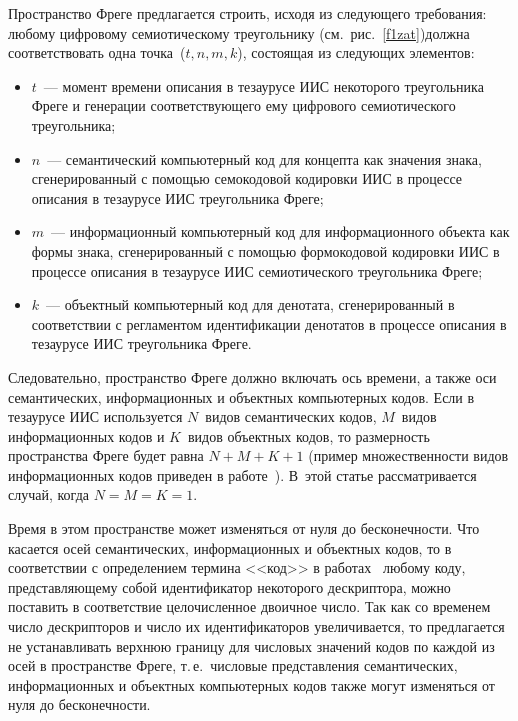 \begin{multicols}{2}
   Пространство Фреге предлагается строить, исходя из следующего требования: любому 
циф\-ровому семиотическому треугольнику (см.\ рис.~\ref{f1zat})\linebreak должна соответствовать 
одна точка~($t, n, m, k$), состоящая из следующих элементов:
   \begin{itemize}
   \item $t$~--- момент времени описания в тезаурусе ИИС некоторого треугольника Фреге и 
генерации соответствующего ему цифрового семиотического треугольника;
\item $n$~--- семантический компьютерный код для концепта как значения знака, 
сгенерированный с помощью семокодовой кодировки ИИС в процессе описания в 
тезаурусе ИИС треугольника Фреге;
\item $m$~--- информационный компьютерный код для информационного объекта 
как формы знака, сгенерированный с помощью формокодовой кодировки ИИС в 
процессе описания в тезаурусе ИИС семиотического треугольника Фреге;
\item $k$~--- объектный компьютерный код для денотата, сгенерированный в 
соответствии с регламентом идентификации денотатов в процессе описания в 
тезаурусе ИИС треугольника \mbox{Фреге}.
\end{itemize}

   Следовательно, пространство Фреге должно включать ось времени, а также оси 
семантических, информационных и объектных компьютерных кодов. Если в тезаурусе ИИС 
используется $N$~видов семантических кодов, $M$~видов информационных кодов и 
$K$~видов объектных кодов, то размерность пространства Фреге будет равна $N + M + K + 
1$ (пример множественности видов информационных кодов приведен в работе~\cite{2zat}). 
В~этой статье рас\-смат\-ри\-ва\-ет\-ся случай, когда $N = M = K = 1$.
   
   Время в этом пространстве может изменяться от нуля до бесконечности. Что касается 
осей семантических, информационных и объектных кодов, то в соответствии с определением 
термина <<код>> в работах~\cite{2zat, 7zat, 10zat, 11zat} любому коду, 
пред\-став\-ля\-юще\-му собой идентификатор некоторого дескриптора, можно поставить в 
соответствие целочисленное двоичное число. Так как со временем число дескрипторов и 
число их идентификаторов увеличивается, то предлагается не устанавливать верхнюю 
границу для числовых значений кодов по каждой из осей в пространстве Фреге, т.\,е.\ 
числовые пред\-став\-ле\-ния семантических, информационных и объектных компьютерных 
кодов также могут изменяться от нуля до бесконечности.
   

\end{multicols}
